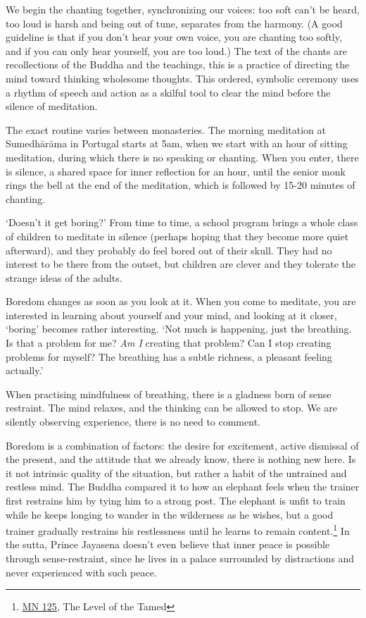 We begin the chanting together, synchronizing our voices: too soft can't
be heard, too loud is harsh and being out of tune, separates from the
harmony. (A good guideline is that if you don't hear your own voice, you
are chanting too softly, and if you can only hear yourself, you are too
loud.) The text of the chants are recollections of the Buddha and the
teachings, this is a practice of directing the mind toward thinking
wholesome thoughts. This ordered, symbolic ceremony uses a rhythm of
speech and action as a skilful tool to clear the mind before the silence
of meditation.

The exact routine varies between monasteries. The morning meditation at
Sumedhārāma in Portugal starts at 5am, when we start with an hour of
sitting meditation, during which there is no speaking or chanting. When
you enter, there is silence, a shared space for inner reflection for an
hour, until the senior monk rings the bell at the end of the meditation,
which is followed by 15-20 minutes of chanting.


`Doesn't it get boring?' From time to time, a school program brings a
whole class of children to meditate in silence (perhaps hoping that they
become more quiet afterward), and they probably do feel bored out of
their skull. They had no interest to be there from the outset, but
children are clever and they tolerate the strange ideas of the adults.

Boredom changes as soon as you look at it. When you come to meditate,
you are interested in learning about yourself and your mind, and looking
at it closer, `boring' becomes rather interesting. `Not much is
happening, just the breathing. Is that a problem for me? \emph{Am I}
creating that problem? Can I stop creating problems for myself? The
breathing has a subtle richness, a pleasant feeling actually.'

When practising mindfulness of breathing, there is a gladness born of
sense restraint. The mind relaxes, and the thinking can be allowed to
stop. We are silently observing experience, there is no need to comment.

Boredom is a combination of factors: the desire for excitement, active
dismissal of the present, and the attitude that we already know, there
is nothing new here. Is it not intrinsic quality of the situation, but
rather a habit of the untrained and restless mind. The Buddha compared
it to how an elephant feels when the trainer first restrains him by
tying him to a strong post. The elephant is unfit to train while he
keeps longing to wander in the wilderness as he wishes, but a good
trainer gradually restrains his restlessness until he learns to remain
content.\footnote{\href{https://suttacentral.net/mn125}{MN 125}, The
  Level of the Tamed} In the sutta, Prince Jayasena doesn't even believe
that inner peace is possible through sense-restraint, since he lives in
a palace surrounded by distractions and never experienced with such
peace.

